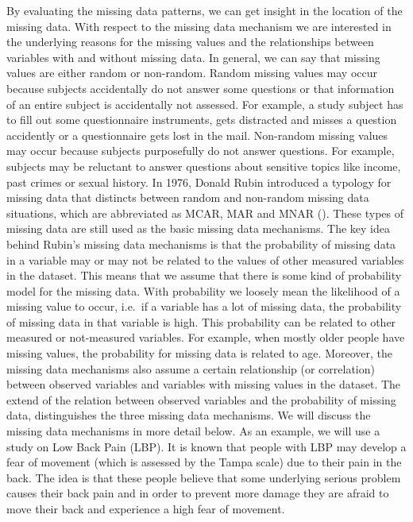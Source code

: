 \documentclass[]{book}
\begin{document}
By evaluating the missing data patterns, we can get insight in the
location of the missing data. With respect to the missing data mechanism
we are interested in the underlying reasons for the missing values and
the relationships between variables with and without missing data. In
general, we can say that missing values are either random or non-random.
Random missing values may occur because subjects accidentally do not
answer some questions or that information of an entire subject is
accidentally not assessed. For example, a study subject has to fill out
some questionnaire instruments, gets distracted and misses a question
accidently or a questionnaire gets lost in the mail. Non-random missing
values may occur because subjects purposefully do not answer questions.
For example, subjects may be reluctant to answer questions about
sensitive topics like income, past crimes or sexual history. In 1976,
Donald Rubin introduced a typology for missing data that distincts
between random and non-random missing data situations, which are
abbreviated as MCAR, MAR and MNAR (\citet{Rubin1976}). These types of
missing data are still used as the basic missing data mechanisms. The
key idea behind Rubin's missing data mechanisms is that the probability
of missing data in a variable may or may not be related to the values of
other measured variables in the dataset. This means that we assume that
there is some kind of probability model for the missing data. With
probability we loosely mean the likelihood of a missing value to occur,
i.e.~if a variable has a lot of missing data, the probability of missing
data in that variable is high. This probability can be related to other
measured or not-measured variables. For example, when mostly older
people have missing values, the probability for missing data is related
to age. Moreover, the missing data mechanisms also assume a certain
relationship (or correlation) between observed variables and variables
with missing values in the dataset. The extend of the relation between
observed variables and the probability of missing data, distinguishes
the three missing data mechanisms. We will discuss the missing data
mechanisms in more detail below. As an example, we will use a study on
Low Back Pain (LBP). It is known that people with LBP may develop a fear
of movement (which is assessed by the Tampa scale) due to their pain in
the back. The idea is that these people believe that some underlying
serious problem causes their back pain and in order to prevent more
damage they are afraid to move their back and experience a high fear of
movement.
\end{document}
